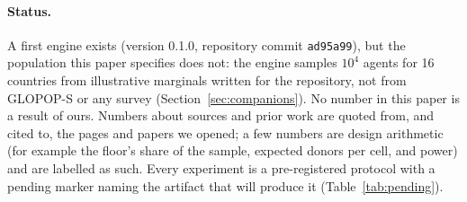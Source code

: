 \documentclass[10pt]{article}
\begin{document}
\paragraph{Status.} A first engine exists (version 0.1.0, repository commit \texttt{ad95a99}), but the population this paper specifies does not: the engine samples $10^4$ agents for 16 countries from illustrative marginals written for the repository, not from GLOPOP-S or any survey (Section~\ref{sec:companions}). No number in this paper is a result of ours. Numbers about sources and prior work are quoted from, and cited to, the pages and papers we opened; a few numbers are design arithmetic (for example the floor's share of the sample, expected donors per cell, and power) and are labelled as such. Every experiment is a pre-registered protocol with a pending marker naming the artifact that will produce it (Table~\ref{tab:pending}).
\end{document}
